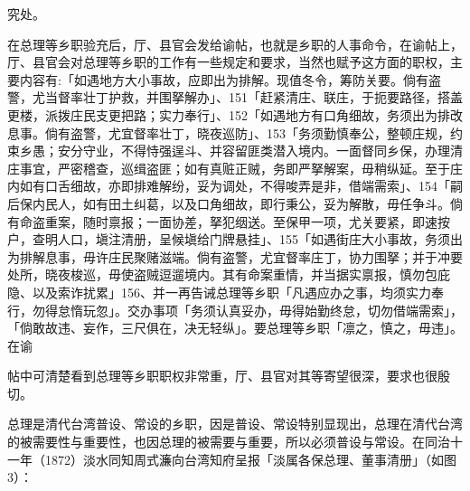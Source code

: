 究处。

\vfill
\begin{BookNotes}
\end{BookNotes}


\noindent 在总理等乡职验充后，厅、县官会发给谕帖，也就是乡职的人事命令，在谕帖上，厅、县官会对总理等乡职的工作有一些规定和要求，当然也赋予这方面的职权，主要内容有:「如遇地方大小事故，应即出为排解。现值冬令，筹防关要。倘有盗警，尤当督率壮丁护救，并围拏解办」、151「赶紧清庄、联庄，于扼要路径，搭盖更楼，派拨庄民支更把路；实力奉行」、152「如遇地方有口角细故，务须出为排改息事。倘有盗警，尤宜督率壮丁，晓夜巡防」、153「务须勤慎奉公，整顿庄规，约束乡愚；安分守业，不得恃强逞斗、并容留匪类潜入境内。一面督同乡保，办理清庄事宜，严密稽查，巡缉盗匪；如有真赃正贼，务即严拏解案，毋稍纵延。至于庄内如有口舌细故，亦即排难解纷，妥为调处，不得唆弄是非，借端需索」、154「嗣后保内民人，如有田土纠葛，以及口角细故，即行秉公，妥为解散，毋任争斗。倘有命盗重案，随时禀报；一面协差，拏犯𬘡送。至保甲一项，尤关要紧，即速按户，查明人口，塡注清册，呈候塡给门牌悬挂」、155「如遇街庄大小事故，务须出为排解息事，毋许庄民聚赌滋端。倘有盗警，尤宜督率庄丁，协力围拏；并于冲要处所，晓夜梭巡，毋使盗贼逗遛境内。其有命案重情，并当据实禀报，慎勿包庇隐、以及索诈扰累」156、并一再告诫总理等乡职「凡遇应办之事，均须实力奉行，勿得怠惰玩忽」。交办事项「务须认真妥办，毋得始勤终怠，切勿借端需索」，「倘敢故违、妄作，三尺俱在，决无轻纵」。要总理等乡职「凛之，慎之，毋违」。在谕

\vfill
\begin{BookNotes}
\end{BookNotes}

帖中可清楚看到总理等乡职职权非常重，厅、县官对其等寄望很深，要求也很殷切。



总理是清代台湾普设、常设的乡职，因是普设、常设特别显现出，总理在清代台湾的被需要性与重要性，也因总理的被需要与重要，所以必须普设与常设。在同治十一年（1872）淡水同知周式濂向台湾知府呈报「淡属各保总理、董事清册」（如图3）：

